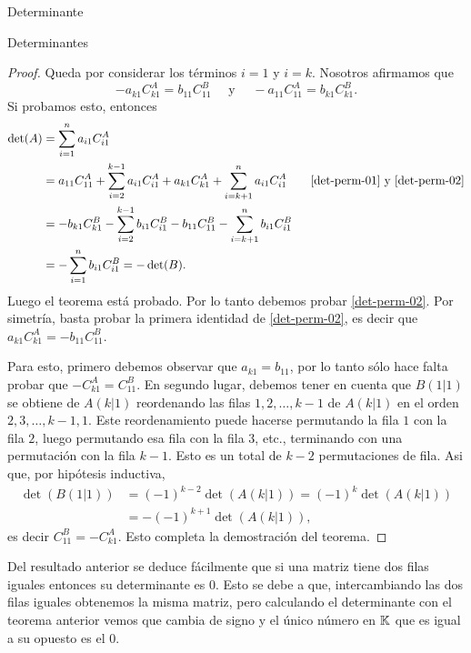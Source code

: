 \begin{chapter}{Determinante}
\begin{section}{Determinantes}
\begin{proof}
            Queda por considerar los términos $i = 1$ y $i = k$. Nosotros afirmamos que
            \begin{equation}\label{det-perm-02}
            -	a_{k1}C^A_{k1} =  b_{11}C^B_{11}  \quad \text{ y } \quad - a_{11}C^A_{11} = b_{k1}C^B_{k1}. 
            \end{equation}
            Si probamos esto, entonces 
            \begin{align*}
            \det(A) &= \sum_{i=1}^{n}  a_{i1}C^A_{i1} \\
            &= a_{11}C^A_{11} +  \sum_{i=2}^{k-1}  a_{i1}C^A_{i1} + a_{k1}C^A_{k1} + \sum_{i=k+1}^{n}  a_{i1}C^A_{i1}\qquad \text{\eqref{det-perm-01} y \eqref{det-perm-02}} \\
            &= -b_{k1}C^B_{k1} - \sum_{i=2}^{k-1}  b_{i1}C^B_{i1} - b_{11}C^B_{11} - \sum_{i=k+1}^{n}  b_{i1}C^B_{i1}  \\
            &= - \sum_{i=1}^{n}  b_{i1}C^B_{i1} =- \det(B).
            \end{align*}
            Luego el teorema está probado. Por lo tanto debemos probar \eqref{det-perm-02}. Por simetría, basta probar la primera identidad de \eqref{det-perm-02},  es decir  que $	a_{k1}C^A_{k1} = - b_{11}C^B_{11}$. 
            
            Para esto, primero debemos observar que $a_{k1} = b_{11}$, por lo tanto sólo hace falta probar que $-C^A_{k1} = C^B_{11}$. En segundo lugar, debemos tener  en cuenta que $B(1|1)$ se obtiene de $A(k|1)$ reordenando las filas $1,2,\ldots, k -1$  de $A(k|1)$ en el orden $2,3, \ldots, k-1,1$. Este reordenamiento puede hacerse permutando la fila $1$ con la fila $2$, luego permutando esa fila con la fila $3$, etc., terminando con una permutación con la fila $k-1$. Esto es un total de $k - 2$  permutaciones de fila. Asi que, por hipótesis inductiva,
            \begin{align*}
            \det(B(1|1)) &= (-1)^{k-2}\det(A(k|1)) = (-1)^{k}\det(A(k|1))\\ 
            &= - (-1)^{k+1}\det(A(k|1)), 
            \end{align*}
            es decir $C^B_{11} = -C^A_{k1}$. Esto completa la demostración del teorema.
        \end{proof}
            
        \begin{observacion*}
            Del resultado anterior se deduce fácilmente que si una matriz tiene dos filas iguales entonces su determinante es 0. Esto se debe a que, intercambiando las dos filas iguales obtenemos la misma matriz, pero calculando el determinante con el teorema anterior vemos que cambia de signo y el único número en $\mathbb K$ que es igual a su opuesto es el 0. 
        \end{observacion*}
    

\end{section}
\end{chapter}

